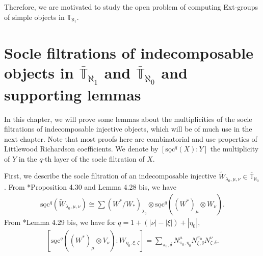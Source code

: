 \documentclass[openany, a4paper]{amsbook}
\theoremstyle{definition}
\numberwithin{equation}{chapter}
\newcommand{\Tbar}[1]{\overline{\mathbb{T}}_{\aleph_{#1}}}
\newcommand{\T}[1]{{\mathbb{T}}_{\aleph_{#1}}}
\newcommand{\socl}[2]{\underline{\mathrm{soc}}^{#1}({#2})}
\begin{document}
Therefore, we are motivated to study the open problem of computing Ext-groups of simple objects in $\T{1}$.

\section{Socle filtrations of indecomposable objects in \texorpdfstring{$\Tbar{1}$}{T 1} and \texorpdfstring{$\Tbar{0}$}{T 0} and supporting lemmas}

In this chapter, we will prove some lemmas about the multiplicities of the socle filtrations of indecomposable injective objects, which will be of much use in the next chapter. Note that most proofs here are combinatorial and use properties of Littlewood Richardson coefficients. We denote by $[\socl{q}{X}: Y]$ the multiplicity of $Y$ in the $q$-th layer of the socle filtration of $X$.

First, we describe the socle filtration of an indecomposable injective $\tilde{W}_{\lambda_0, \mu, \nu} \in \Tbar{0}$. From \cite{cp17}*{Proposition 4.30 and Lemma 4.28 bis}, we have
\begin{align}\label{30 W}
    \socl{q}{\tilde{W}_{\lambda_0, \mu, \nu}} \cong \sum (W^\ast/W_\ast)_{\lambda_0} \otimes \socl{q}{ (W^*)_\mu \otimes W_\nu}.
\end{align}
From \cite{cp17}*{Lemma 4.29 bis}, we have for $q = 1 + (\left\lvert \nu \right\rvert - \left\lvert \xi \right\rvert ) + \left\lvert \eta_0 \right\rvert$,
\begin{align}\label{29 W}
    \left[ \socl{q}{(W^\ast)_\mu \otimes V_\nu } \colon W_{\eta_0, \xi, \zeta }  \right] = \sum_{\pi_0, \delta} N^{\mu}_{\pi_0, \eta_0} N^{\pi_0}_{\xi, \delta} N^{\nu}_{\zeta, \delta}.
\end{align}
\end{document}
